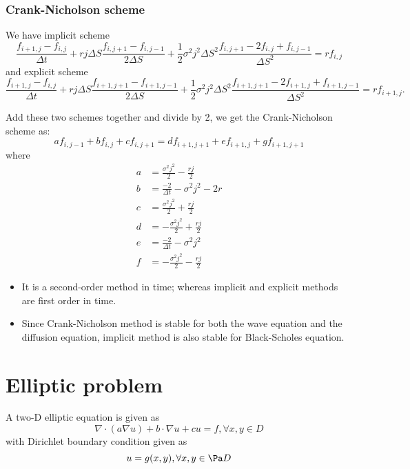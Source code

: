 \begin{refsection}
\subsubsection{Crank-Nicholson scheme}
\begin{definition}
We have implicit scheme
$$\frac{f_{i+1,j}-f_{i,j}}{\Delta t} + rj\Delta S \frac{f_{i,j+1}-f_{i,j-1}}{2\Delta S} + \frac{1}{2}\sigma^2j^2\Delta S^2 \frac{f_{i,j+1}-2f_{i,j}+f_{i,j-1}}{\Delta S^2} = rf_{i,j}$$
and explicit scheme
$$\frac{f_{i+1,j}-f_{i,j}}{\Delta t} + rj\Delta S \frac{f_{i+1,j+1}-f_{i+1,j-1}}{2\Delta S} + \frac{1}{2}\sigma^2j^2\Delta S^2 \frac{f_{i+1,j+1}-2f_{i+1,j}+f_{i+1,j-1}}{\Delta S^2} = rf_{i+1,j}.$$

Add these two schemes together and divide by 2, we get
the Crank-Nicholson scheme as:
$$a f_{i,j-1} + b f_{i,j} + cf_{i,j+1} = d f_{i+1,j+1} + e f_{i+1,j} +g f_{i+1,j+1}$$
where
\begin{align*}
a &= \frac{\sigma^2 j^2}{2} - \frac{rj}{2}\\
b &= \frac{-2}{\Delta t} -\sigma^2j^2- 2r\\
c &= \frac{\sigma^2 j^2}{2} + \frac{rj}{2}\\
d &= -\frac{\sigma^2 j^2}{2} + \frac{rj}{2}\\
e &= \frac{-2}{\Delta t} -\sigma^2j^2\\
f &= -\frac{\sigma^2 j^2}{2} - \frac{rj}{2}
\end{align*}
\end{definition}

\begin{remark}\hfill
	\begin{itemize}
		\item  It is a second-order method in time; whereas implicit and explicit methods are first order in time. 
		\item Since  Crank-Nicholson method is stable for both the wave equation and the diffusion equation, implicit method is also stable for Black-Scholes equation.
	\end{itemize}	
\end{remark}


\section{Elliptic problem}
\begin{definition}
A two-D elliptic equation is given as
$$\nabla \cdot (a \nabla u) + b \cdot \nabla u + cu = f,\forall x,y \in D$$
with Dirichlet boundary condition given as
$$u = g(x,y), \forall x,y\in \Pa D$$
\end{definition}



\end{refsection}
